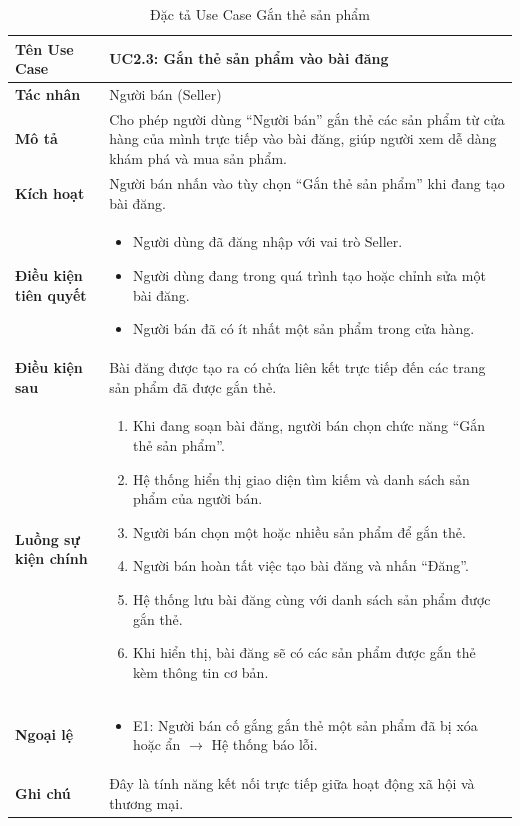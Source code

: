 \begin{table}[H]
\centering
\begin{tabularx}{\textwidth}{|l|X|}
\hline
\textbf{Tên Use Case} & \textbf{UC2.3: Gắn thẻ sản phẩm vào bài đăng} \\ \hline
\textbf{Tác nhân} & Người bán (Seller) \\ \hline
\textbf{Mô tả} & Cho phép người dùng ``Người bán'' gắn thẻ các sản phẩm từ cửa hàng của mình trực tiếp vào bài đăng, giúp người xem dễ dàng khám phá và mua sản phẩm. \\ \hline
\textbf{Kích hoạt} & Người bán nhấn vào tùy chọn ``Gắn thẻ sản phẩm'' khi đang tạo bài đăng. \\ \hline
\textbf{Điều kiện tiên quyết} & 
\begin{itemize}
    \item Người dùng đã đăng nhập với vai trò Seller.
    \item Người dùng đang trong quá trình tạo hoặc chỉnh sửa một bài đăng.
    \item Người bán đã có ít nhất một sản phẩm trong cửa hàng.
\end{itemize} \\ \hline
\textbf{Điều kiện sau} & Bài đăng được tạo ra có chứa liên kết trực tiếp đến các trang sản phẩm đã được gắn thẻ. \\ \hline
\textbf{Luồng sự kiện chính} & 
\begin{enumerate}
    \item Khi đang soạn bài đăng, người bán chọn chức năng ``Gắn thẻ sản phẩm''.
    \item Hệ thống hiển thị giao diện tìm kiếm và danh sách sản phẩm của người bán.
    \item Người bán chọn một hoặc nhiều sản phẩm để gắn thẻ.
    \item Người bán hoàn tất việc tạo bài đăng và nhấn ``Đăng''.
    \item Hệ thống lưu bài đăng cùng với danh sách sản phẩm được gắn thẻ.
    \item Khi hiển thị, bài đăng sẽ có các sản phẩm được gắn thẻ kèm thông tin cơ bản.
\end{enumerate} \\ \hline
\textbf{Ngoại lệ} & 
\begin{itemize}
    \item E1: Người bán cố gắng gắn thẻ một sản phẩm đã bị xóa hoặc ẩn $\rightarrow$ Hệ thống báo lỗi.
\end{itemize} \\ \hline
\textbf{Ghi chú} & Đây là tính năng kết nối trực tiếp giữa hoạt động xã hội và thương mại. \\ \hline
\end{tabularx}
\caption{Đặc tả Use Case Gắn thẻ sản phẩm}
\end{table}

